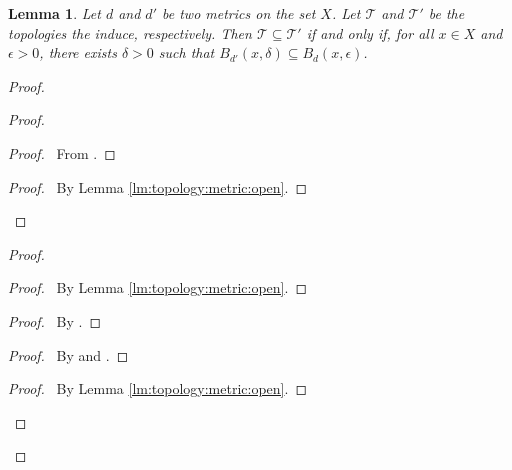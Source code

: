 \documentclass{report}
\let\qed\relax
\newtheorem{lm}{Lemma}[section]
\theoremstyle{definition}
\begin{document}
  \begin{lm}
    Let $d$ and $d'$ be two metrics on the set $X$. Let $\mathcal{T}$ and
    $\mathcal{T}'$ be the topologies the induce, respectively. Then
    $\mathcal{T} \subseteq \mathcal{T}'$ if and only if, for all $x \in X$ and
    $\epsilon > 0$, there exists $\delta > 0$ such that $B_{d'}(x, \delta)
    \subseteq B_d(x, \epsilon)$.
  \end{lm}

  \begin{proof}
    \pf
    \begin{proof}
      \begin{proof}
        \pf\ From .
      \end{proof}
      \begin{proof}
        \pf\ By Lemma \ref{lm:topology:metric:open}.
      \end{proof}
    \end{proof}
    \begin{proof}
      \begin{proof}
        \pf\ By Lemma \ref{lm:topology:metric:open}.
      \end{proof}
      \begin{proof}
        \pf\ By .
      \end{proof}
      \begin{proof}
        \pf\ By  and .
      \end{proof}
      \qedstep
      \begin{proof}
        \pf\ By Lemma \ref{lm:topology:metric:open}.
      \end{proof}
    \end{proof}
    \qed
  \end{proof}
\end{document}
